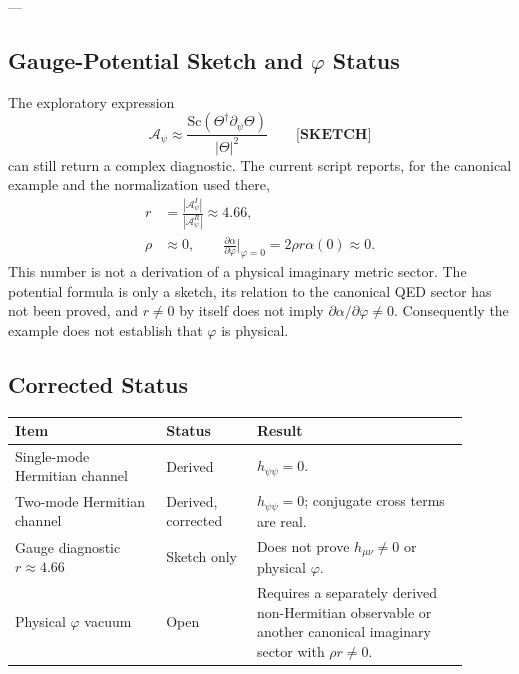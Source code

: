 ---

\subsection{Gauge-Potential Sketch and $\varphi$ Status}
\label{sec:r_and_dalpha_dphi}

The exploratory expression
\begin{equation}
 \mathcal A_\psi\approx
 \frac{\mathrm{Sc}(\Theta^\dagger\partial_\psi\Theta)}{|\Theta|^2}
 \label{eq:gauge_potential_sketch}
 \qquad\textbf{[SKETCH]}
\end{equation}
can still return a complex diagnostic.  The current script reports, for the
canonical example and the normalization used there,
\begin{align}
 r&=\frac{|\mathcal A^I_\psi|}{|\mathcal A^R_\psi|}\approx4.66,
 \label{eq:r_numerical}\\
 \rho&\approx0,\qquad
 \frac{\partial\alpha}{\partial\varphi}\bigg|_{\varphi=0}
 =2\rho r\alpha(0)\approx0.
 \label{eq:dalpha_dphi_numerical}
\end{align}
This number is not a derivation of a physical imaginary metric sector.  The
potential formula is only a sketch, its relation to the canonical QED sector
has not been proved, and $r\neq0$ by itself does not imply
$\partial\alpha/\partial\varphi\neq0$.  Consequently the example does not
establish that $\varphi$ is physical.

\subsection{Corrected Status}
\label{sec:biq_vacuum_summary}

\begin{center}
\begin{tabular}{p{0.30\linewidth}p{0.18\linewidth}p{0.42\linewidth}}
\hline
Item & Status & Result \\
\hline
Single-mode Hermitian channel & Derived & $h_{\psi\psi}=0$. \\
Two-mode Hermitian channel & Derived, corrected & $h_{\psi\psi}=0$; conjugate cross terms are real. \\
Gauge diagnostic $r\approx4.66$ & Sketch only & Does not prove $h_{\mu\nu}\neq0$ or physical $\varphi$. \\
Physical $\varphi$ vacuum & Open & Requires a separately derived non-Hermitian observable or another canonical imaginary sector with $\rho r\neq0$. \\
\hline
\end{tabular}
\end{center}

